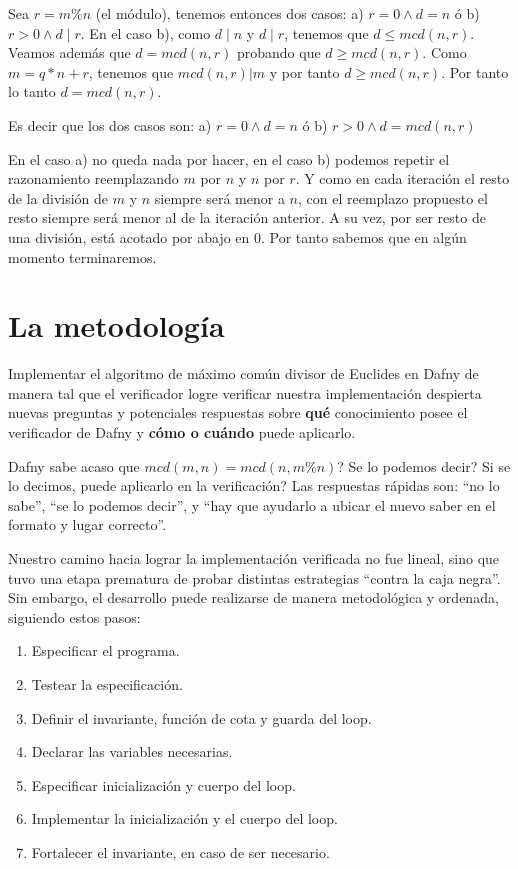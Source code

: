 \documentclass[12pt, a4paper, openany, fleqn]{book}
\begin{document}
    Sea $r = m \% n$ (el módulo), tenemos entonces dos casos: a) $r = 0 \land d = n$ ó b) $r > 0 \land d \mid r $. En el caso b), como $d \mid n$ y $d \mid r$, tenemos que $d \leq mcd(n, r)$. Veamos además que $d = mcd(n,r)$ probando que $d \geqslant mcd(n,r)$. Como $m = q * n + r$, tenemos que $mcd(n, r) | m$ y por tanto $d \geqslant mcd(n,r)$. Por tanto lo tanto $d = mcd(n,r)$.

    Es decir que los dos casos son: a) $r = 0 \land d = n$ ó b) $r > 0 \land d = mcd(n, r) $

    En el caso a) no queda nada por hacer, en el caso b) podemos repetir el razonamiento reemplazando $m$ por $n$ y $n$ por $r$. Y como en cada iteración el resto de la división de $m$ y $n$ siempre será menor a $n$, con el reemplazo propuesto el resto siempre será menor al de la iteración anterior. A su vez, por ser resto de una división, está acotado por abajo en $0$. Por tanto sabemos que en algún momento terminaremos.

    \section{La metodología}
    Implementar el algoritmo de máximo común divisor de Euclides en Dafny de manera tal que el verificador logre verificar nuestra implementación despierta nuevas preguntas y potenciales respuestas sobre \textbf{qué} conocimiento posee el verificador de Dafny y \textbf{cómo o cuándo} puede aplicarlo.

    Dafny sabe acaso que $mcd(m, n) = mcd(n, m\%n)$? Se lo podemos decir? Si se lo decimos, puede aplicarlo en la verificación?
    Las respuestas rápidas son: ``no lo sabe'', ``se lo podemos decir'', y ``hay que ayudarlo a ubicar el nuevo saber en el formato y lugar correcto''.

    Nuestro camino hacia lograr la implementación verificada no fue lineal, sino que tuvo una etapa prematura de probar distintas estrategias ``contra la caja negra''. Sin embargo, el desarrollo puede realizarse de manera metodológica y ordenada, siguiendo estos pasos:
    \begin{enumerate}
        \item Especificar el programa.
        \item Testear la especificación.
        \item Definir el invariante, función de cota y guarda del loop.
        \item Declarar las variables necesarias.
        \item Especificar inicialización y cuerpo del loop.
        \item Implementar la inicialización y el cuerpo del loop.
        \item Fortalecer el invariante, en caso de ser necesario.
    \end{enumerate}
\end{document}
